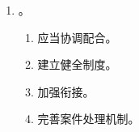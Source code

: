 \begin{enumerate}
\begin{enumerate}
\begin{enumerate}
                        \begin{enumerate}
                          \item 不能直接操作账户 \yjt 向金融机构交付冻结书 \yjt 银行立即冻结。
                          \item 事后 3 日内再向当事人送达通知书。
                        \end{enumerate}
                \end{enumerate}
        \end{enumerate}
  \item {}。
        \begin{enumerate}
          \item 应当协调配合。
          \item 建立健全制度。
          \item 加强衔接。
          \item 完善案件处理机制。
        \end{enumerate}
\end{enumerate}
